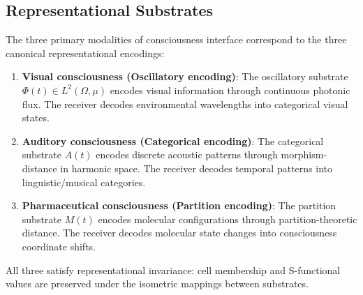 \subsection{Representational Substrates}

\begin{theorem}
\label{thm:modality-rep}
The three primary modalities of consciousness interface correspond to the three canonical representational encodings:

\begin{enumerate}[label=(\alph*),leftmargin=*]
\item \textbf{Visual consciousness (Oscillatory encoding)}:
The oscillatory substrate $\Phi(t) \in L^2(\Omega,\mu)$ encodes visual information through continuous photonic flux. The receiver decodes environmental wavelengths into categorical visual states.

\item \textbf{Auditory consciousness (Categorical encoding)}:
The categorical substrate $A(t)$ encodes discrete acoustic patterns through morphism-distance in harmonic space. The receiver decodes temporal patterns into linguistic/musical categories.

\item \textbf{Pharmaceutical consciousness (Partition encoding)}:
The partition substrate $M(t)$ encodes molecular configurations through partition-theoretic distance. The receiver decodes molecular state changes into consciousness coordinate shifts.
\end{enumerate}

All three satisfy representational invariance: cell membership and S-functional values are preserved under the isometric mappings between substrates.
\end{theorem}

